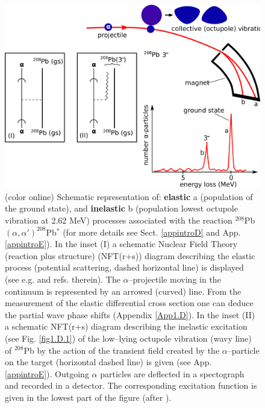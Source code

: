 \begin{figure}
\centerline {
\includegraphics*[width=15cm]{introduccion/figs/figintro1}
}
\caption{(color online) Schematic representation of:  \textbf{elastic} a (population of the ground state), and \textbf{inelastic} b (population lowest octupole vibration at 2.62 MeV) processes associated with the reaction $^{208}$Pb$(\alpha,\alpha')^{208}$Pb$^*$ (for more details see Sect. \ref{appintroD} and App. \ref{appintroE}).  In the inset (I) a schematic Nuclear Field Theory (reaction plus structure) (NFT(r+s)) diagram describing  the elastic process (potential scattering, dashed horizontal line) is displayed (see e.g. \cite{Broglia:16} and refs. therein). The $\alpha$--projectile moving in the continuum is represented by an arrowed (curved) line. From the measurement of the elastic differential cross section one can deduce the partial wave phase shifts (Appendix \ref{App1.D}). In the inset (II) a schematic NFT(r+s) diagram describing the inelastic  excitation (see Fig. \ref{fig1.D.1}) of the low--lying octupole vibration (wavy line) of $^{208}$Pb by the action of the transient field created by the $\alpha$--particle on the target (horizontal dashed line) is given (see App. \ref{appintroE}).  Outgoing $\alpha$ particles are deflected in a spectograph and recorded in a detector. The corresponding excitation function is given in the lowest part of the figure (after \cite{Mottelson:76b}).}
\label{figintro1}
\end{figure}
